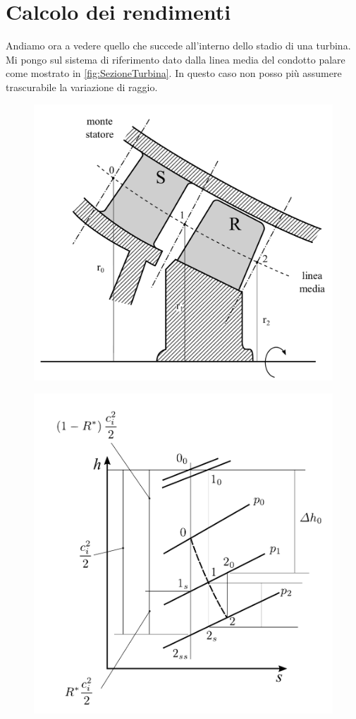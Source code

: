 \section{Calcolo dei rendimenti}
Andiamo ora a vedere quello che succede all'interno dello stadio di una turbina. Mi pongo sul sistema di riferimento dato dalla linea media del condotto palare come mostrato in \ref{fig:SezioneTurbina}. In questo caso non posso più assumere trascurabile la variazione di raggio. 
\begin{figure}
\centering
\begin{minipage}{.5\textwidth}
  \centering
  \includegraphics[width=.95\linewidth]{fig/SezioneTurbina.pdf}
  \label{fig:SezioneTurbina}
\end{minipage}%
\begin{minipage}{.5\textwidth}
  \centering
  \includegraphics[width=.95\linewidth]{fig/hsturbine.pdf}
  \label{fig:hsturbine}
\end{minipage}
\end{figure}
